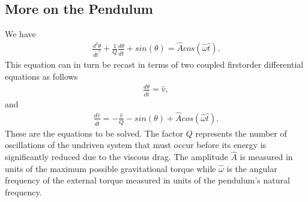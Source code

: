 \documentclass[letterpaper,10pt,english]{sphinxmanual}
\begin{document}
\subsection{More on the Pendulum}
\label{\detokenize{chapter4:more-on-the-pendulum}}
We have
\begin{equation*}
\begin{split}
\frac{d^2\theta}{d\hat{t}^2}+\frac{1}{Q}\frac{d\theta}{d\hat{t}}  
     +sin(\theta)=\hat{A}cos(\hat{\omega}\hat{t}).
\end{split}
\end{equation*}
This equation can in turn be recast in terms of two coupled first\sphinxhyphen{}order differential equations as follows
\begin{equation*}
\begin{split}
\frac{d\theta}{d\hat{t}}=\hat{v},
\end{split}
\end{equation*}
and
\begin{equation*}
\begin{split}
\frac{d\hat{v}}{d\hat{t}}=-\frac{\hat{v}}{Q}-sin(\theta)+\hat{A}cos(\hat{\omega}\hat{t}).
\end{split}
\end{equation*}
These are the equations to be solved.  The factor \(Q\) represents the
number of oscillations of the undriven system that must occur before
its energy is significantly reduced due to the viscous drag. The
amplitude \(\hat{A}\) is measured in units of the maximum possible
gravitational torque while \(\hat{\omega}\) is the angular frequency of
the external torque measured in units of the pendulum’s natural
frequency.







\renewcommand{\indexname}{Index}
\printindex
\end{document}
